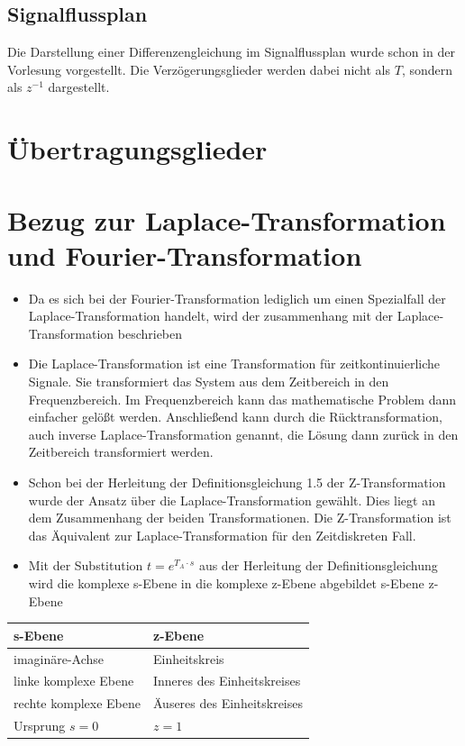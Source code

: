 \documentclass[11pt]{article}
\begin{document}
    \subsection{Signalflussplan}\label{signalflussplan}

Die Darstellung einer Differenzengleichung im Signalflussplan wurde
schon in der Vorlesung vorgestellt. Die Verzögerungsglieder werden dabei
nicht als \(T\), sondern als \(z^{-1}\) dargestellt.

    \section{Übertragungsglieder}\label{uxfcbertragungsglieder}

    \section{Bezug zur Laplace-Transformation und
Fourier-Transformation}\label{bezug-zur-laplace-transformation-und-fourier-transformation}

\begin{itemize}
\item
  Da es sich bei der Fourier-Transformation lediglich um einen
  Spezialfall der Laplace-Transformation handelt, wird der zusammenhang
  mit der Laplace-Transformation beschrieben
\item
  Die Laplace-Transformation ist eine Transformation für
  zeitkontinuierliche Signale. Sie transformiert das System aus dem
  Zeitbereich in den Frequenzbereich. Im Frequenzbereich kann das
  mathematische Problem dann einfacher gelößt werden. Anschließend kann
  durch die Rücktransformation, auch inverse Laplace-Transformation
  genannt, die Lösung dann zurück in den Zeitbereich transformiert
  werden.
\item
  Schon bei der Herleitung der Definitionsgleichung 1.5 der
  Z-Transformation wurde der Ansatz über die Laplace-Transformation
  gewählt. Dies liegt an dem Zusammenhang der beiden Transformationen.
  Die Z-Transformation ist das Äquivalent zur Laplace-Transformation für
  den Zeitdiskreten Fall.
\item
  Mit der Substitution \(t = e^{T_A \cdot s}\) aus der Herleitung der
  Definitionsgleichung wird die komplexe s-Ebene in die komplexe z-Ebene
  abgebildet s-Ebene z-Ebene
\end{itemize}

\begin{longtable}[]{@{}ll@{}}
\toprule
s-Ebene & z-Ebene\tabularnewline
\midrule
\endhead
imaginäre-Achse & Einheitskreis\tabularnewline
linke komplexe Ebene & Inneres des Einheitskreises\tabularnewline
rechte komplexe Ebene & Äuseres des Einheitskreises\tabularnewline
Ursprung \(s = 0\) & \(z = 1\)\tabularnewline
\bottomrule
\end{longtable}
\end{document}
